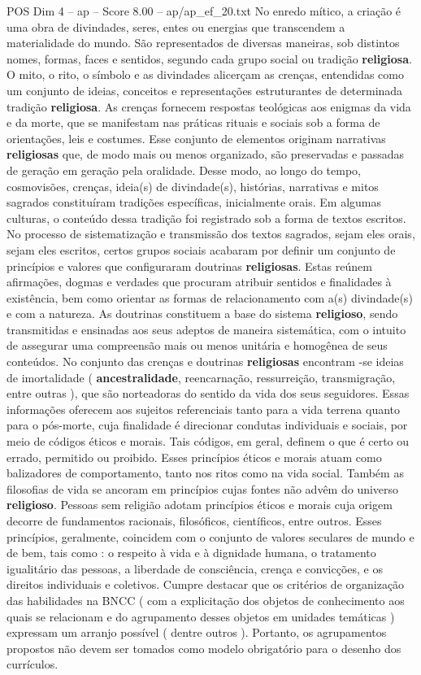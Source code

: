 \begin{textsample}{POS Dim 4 – ap – Score 8.00 – ap/ap\_ef\_20.txt}
No enredo mítico, a criação é uma obra de divindades, seres, entes ou energias que transcendem a materialidade do mundo.
São representados de diversas maneiras, sob distintos nomes, formas, faces e sentidos, segundo cada grupo social ou tradição \textbf{religiosa}.
O mito, o rito, o símbolo e as divindades alicerçam as crenças, entendidas como um conjunto de ideias, conceitos e representações estruturantes de determinada tradição \textbf{religiosa}.
As crenças fornecem respostas teológicas aos enigmas da vida e da morte, que se manifestam nas práticas rituais e sociais sob a forma de orientações, leis e costumes.
Esse conjunto de elementos originam narrativas \textbf{religiosas} que, de modo mais ou menos organizado, são preservadas e passadas de geração em geração pela oralidade.
Desse modo, ao longo do tempo, cosmovisões, crenças, ideia(s) de divindade(s), histórias, narrativas e mitos sagrados constituíram tradições específicas, inicialmente orais.
Em algumas culturas, o conteúdo dessa tradição foi registrado sob a forma de textos escritos.
No processo de sistematização e transmissão dos textos sagrados, sejam eles orais, sejam eles escritos, certos grupos sociais acabaram por definir um conjunto de princípios e valores que configuraram doutrinas \textbf{religiosas}.
Estas reúnem afirmações, dogmas e verdades que procuram atribuir sentidos e finalidades à existência, bem como orientar as formas de relacionamento com a(s) divindade(s) e com a natureza.
As doutrinas constituem a base do sistema \textbf{religioso}, sendo transmitidas e ensinadas aos seus adeptos de maneira sistemática, com o intuito de assegurar uma compreensão mais ou menos unitária e homogênea de seus conteúdos.
No conjunto das crenças e doutrinas \textbf{religiosas} encontram -se ideias de imortalidade ( \textbf{ancestralidade}, reencarnação, ressurreição, transmigração, entre outras ), que são norteadoras do sentido da vida dos seus seguidores.
Essas informações oferecem aos sujeitos referenciais tanto para a vida terrena quanto para o pós-morte, cuja finalidade é direcionar condutas individuais e sociais, por meio de códigos éticos e morais.
Tais códigos, em geral, definem o que é certo ou errado, permitido ou proibido.
Esses princípios éticos e morais atuam como balizadores de comportamento, tanto nos ritos como na vida social.
Também as filosofias de vida se ancoram em princípios cujas fontes não advêm do universo \textbf{religioso}.
Pessoas sem religião adotam princípios éticos e morais cuja origem decorre de fundamentos racionais, filosóficos, científicos, entre outros.
Esses princípios, geralmente, coincidem com o conjunto de valores seculares de mundo e de bem, tais como : o respeito à vida e à dignidade humana, o tratamento igualitário das pessoas, a liberdade de consciência, crença e convicções, e os direitos individuais e coletivos.
Cumpre destacar que os critérios de organização das habilidades na BNCC ( com a explicitação dos objetos de conhecimento aos quais se relacionam e do agrupamento desses objetos em unidades temáticas ) expressam um arranjo possível ( dentre outros ).
Portanto, os agrupamentos propostos não devem ser tomados como modelo obrigatório para o desenho dos currículos.

\end{textsample}
